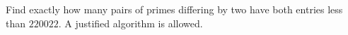 Find exactly how many pairs of primes differing by two have both entries less than $220022$. A justified algorithm is allowed.
